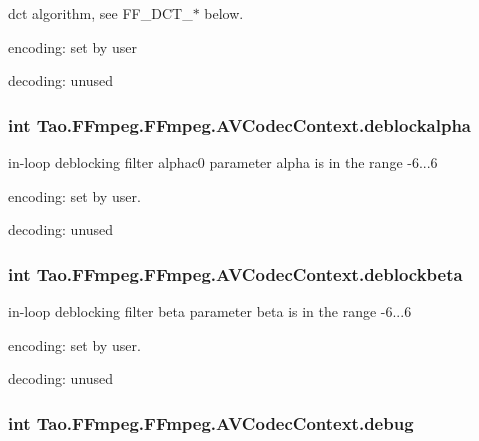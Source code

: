 \label{struct_tao_1_1_f_fmpeg_1_1_f_fmpeg_1_1_a_v_codec_context_afabb7149cf6dd133f2c4a3bcd45d1174}
dct algorithm, see FF\_\-DCT\_\-$\ast$ below.
\begin{DoxyItemize}
\item encoding: set by user
\item decoding: unused 
\end{DoxyItemize}\hypertarget{struct_tao_1_1_f_fmpeg_1_1_f_fmpeg_1_1_a_v_codec_context_a8bbb52ee8befe0a6d5ac2fbaf670c57b}{
\subsubsection[{deblockalpha}]{\setlength{\rightskip}{0pt plus 5cm}int {\bf Tao.FFmpeg.FFmpeg.AVCodecContext.deblockalpha}}}
\label{struct_tao_1_1_f_fmpeg_1_1_f_fmpeg_1_1_a_v_codec_context_a8bbb52ee8befe0a6d5ac2fbaf670c57b}
in-\/loop deblocking filter alphac0 parameter alpha is in the range -\/6...6
\begin{DoxyItemize}
\item encoding: set by user.
\item decoding: unused 
\end{DoxyItemize}\hypertarget{struct_tao_1_1_f_fmpeg_1_1_f_fmpeg_1_1_a_v_codec_context_ac89091636324213e77b456b7d74d932e}{
\subsubsection[{deblockbeta}]{\setlength{\rightskip}{0pt plus 5cm}int {\bf Tao.FFmpeg.FFmpeg.AVCodecContext.deblockbeta}}}
\label{struct_tao_1_1_f_fmpeg_1_1_f_fmpeg_1_1_a_v_codec_context_ac89091636324213e77b456b7d74d932e}
in-\/loop deblocking filter beta parameter beta is in the range -\/6...6
\begin{DoxyItemize}
\item encoding: set by user.
\item decoding: unused 
\end{DoxyItemize}\hypertarget{struct_tao_1_1_f_fmpeg_1_1_f_fmpeg_1_1_a_v_codec_context_a208361fed669cdcef53b7d362f927360}{
\subsubsection[{debug}]{\setlength{\rightskip}{0pt plus 5cm}int {\bf Tao.FFmpeg.FFmpeg.AVCodecContext.debug}}}
